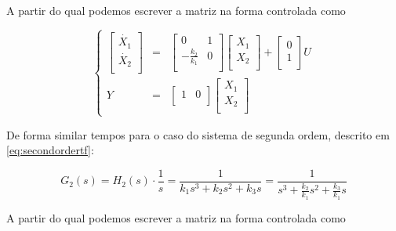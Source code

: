 \documentclass[a4paper,11pt]{article}
\begin{document}
A partir do qual podemos escrever a matriz na forma controlada como

\begin{equation}
\left\{
\begin{array}{rcl}
\left[\begin{array}{c}
    \dot{X_1} \\
    \dot{X_2} \\
\end{array}
\right]
&
=
&
\left[
\begin{array}{cc}
    0 & 1 \\
    -\frac{k_2}{k_1} & 0 \\ 
\end{array}
\right]
\left[\begin{array}{c}
    X_1 \\
    X_2 \\
\end{array}
\right]
+
\left[\begin{array}{c}
    0 \\
    1 \\
\end{array}
\right]
U\\
Y & = &\left[
\begin{array}{cc}
    1 & 0 \\
\end{array}
\right]
\left[\begin{array}{c}
    X_1 \\
    X_2 \\
\end{array}
\right]
\end{array}
\right.
\end{equation}

De forma similar tempos para o caso do sistema de segunda ordem, descrito em \ref{eq:secondordertf}:

$$
G_2(s) = H_2(s)\cdot \frac{1}{s} = \frac{1}{k_1 s^3 + k_2 s^2 + k_3 s} = \frac{1}{s^3 + \frac{k_2}{k_1} s^2 + \frac{k_3}{k_1} s}
$$

A partir do qual podemos escrever a matriz na forma controlada como
\end{document}
